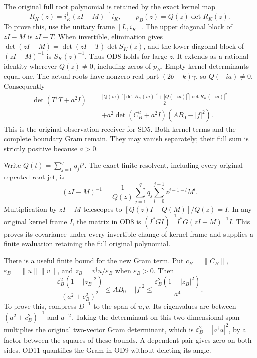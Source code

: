 \documentclass[11pt]{article}
\newcommand{\eps}{\varepsilon}
\begin{document}
The original full root polynomial is retained by the exact kernel map
\begin{equation}\tag{OD8}
 R_K(z)=i_K^\dagger(zI-M)^{-1}i_K,
 \qquad \boxed{p_B(z)=Q(z)\det R_K(z).}
\end{equation}
To prove this, use the unitary frame $[L,i_K]$. The upper diagonal
block of $zI-M$ is $zI-T$. When invertible, elimination gives
$\det(zI-M)=\det(zI-T)\det S_K(z)$, and the lower diagonal block
of $(zI-M)^{-1}$ is $S_K(z)^{-1}$. Thus OD8 holds for large $z$.
It extends as a rational identity wherever $Q(z)\ne0$, including
zeros of $p_B$. Empty kernel determinants equal one. The actual
roots have nonzero real part $(2b-k)\gamma$, so $Q(\pm ia)\ne0$.
Consequently
\begin{equation}\tag{OD9}\boxed{\begin{aligned}
 \det(T^\dagger T+a^2I)
 ={}&\frac{|Q(ia)|^2|\det R_K(ia)|^2
              +|Q(-ia)|^2|\det R_K(-ia)|^2}{2}\\
 &+a^2\det(C_B^2+a^2I)(AB_0-|f|^2).
\end{aligned}}\end{equation}
This is the original observation receiver for SD5. Both kernel terms
and the complete boundary Gram remain. They may vanish separately;
their full sum is strictly positive because $a>0$.

Write $Q(t)=\sum_{j=0}^q q_jt^j$. The exact finite resolvent, including
every original repeated-root jet, is
\begin{equation}\tag{OD10}
 (zI-M)^{-1}=\frac1{Q(z)}
 \sum_{j=1}^q q_j\sum_{l=0}^{j-1}z^{j-1-l}M^l.
\end{equation}
Multiplication by $zI-M$ telescopes to $[Q(z)I-Q(M)]/Q(z)=I$.
In any original kernel frame $I$, the matrix in OD8 is
$(I^*GI)^{-1}I^*G(zI-M)^{-1}I$. This proves its covariance under
every invertible change of kernel frame and supplies a finite
evaluation retaining the full original polynomial.

There is a useful finite bound for the new Gram term. Put
$c_B=\|C_B\|$, $\eps_B=\|u\|\|v\|$, and
$z_B=v^\dagger u/\eps_B$ when $\eps_B>0$. Then
\begin{equation}\tag{OD11}
 \frac{\eps_B^2(1-|z_B|^2)}{(a^2+c_B^2)^2}
 \le AB_0-|f|^2\le
 \frac{\eps_B^2(1-|z_B|^2)}{a^4}.
\end{equation}
To prove this, compress $D^{-1}$ to the span of $u,v$. Its eigenvalues
are between $(a^2+c_B^2)^{-1}$ and $a^{-2}$. Taking the determinant
on this two-dimensional span multiplies the original two-vector Gram
determinant, which is $\eps_B^2-|v^\dagger u|^2$, by a factor between
the squares of these bounds. A dependent pair gives zero on both
sides. OD11 quantifies the Gram in OD9 without deleting its angle.
\end{document}
